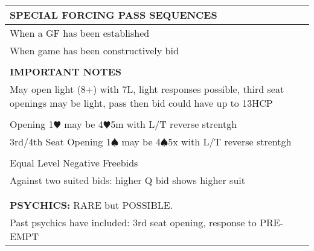 \documentclass{article}
\renewcommand\H{\color{red}\ensuremath{\varheartsuit}}
\renewcommand\S{\ensuremath{\spadesuit}}
\begin{document}
\begin{minipage}{90mm}
\begin{tabular}{| p{88mm} |}
		\cellcolor{orange!25}\textbf{SPECIAL FORCING PASS SEQUENCES} \\ \hline
		When a GF has been established\\ \hline
		When game has been constructively bid\\ \hline
		\\ \hline
		\cellcolor{orange!25}\textbf{IMPORTANT NOTES} \\ \hline
		May open light (8+) with 7L, light responses possible, 
		third seat openings may be light,		
		pass then bid could have up to 13HCP\\ \hline
		\\ \hline		
		Opening 1{\H} may be 4{\H}5m with L/T reverse strentgh\\ \hline
		3rd/4th Seat Opening 1{\S} may be 4{\S}5x with L/T reverse strentgh\\ \hline
		\\ \hline
		Equal Level Negative Freebids\\ \hline
		Against two suited bids: higher Q bid shows higher suit \\ \hline
		\\ \hline
		\\ \hline

		\cellcolor{orange!25}\textbf{PSYCHICS:} RARE but POSSIBLE.  \\ \hline
		Past psychics have included: 3rd seat opening, response to PRE-EMPT \\ \hline
	\end{tabular}
\end{minipage}
\end{document}
